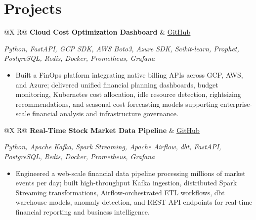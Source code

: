 \documentclass[a4paper,10pt]{article}
\newcommand{\ulink}[2]{\href{#1}{\uline{#2}}}
\newcommand{\subheading}[1]{{\color[HTML]{0A0A0A}\fontsize{12}{14}\selectfont\bfseries #1}}
\newcommand{\techstack}[1]{{\color[HTML]{5C5C5C}\fontsize{10.5}{12.5}\selectfont\itshape #1}}
\newcommand{\meta}[1]{{\color[HTML]{5C5C5C}\fontsize{10.5}{12.5}\selectfont #1}}
\begin{document}
\vspace{2pt}

\section{Projects}
\vspace{2pt}

\begin{tabularx}{\linewidth}{@{}X R@{}}
  \subheading{Cloud Cost Optimization Dashboard} &
  \meta{\ulink{https://github.com/su-jin1425/Cloud-Cost-Optimization-Dashboard}{GitHub}}
\end{tabularx}
\vspace{1pt}
\techstack{Python, FastAPI, GCP SDK, AWS Boto3, Azure SDK, Scikit-learn, Prophet, PostgreSQL, Redis, Docker, Prometheus, Grafana}
\begin{itemize}[nosep, leftmargin=1.5em, itemsep=1pt, topsep=2pt]
  \item {\color[HTML]{0A0A0A}\fontsize{11}{14}\selectfont Built a FinOps platform integrating native billing APIs across GCP, AWS, and Azure; delivered unified financial planning dashboards, budget monitoring, Kubernetes cost allocation, idle resource detection, rightsizing recommendations, and seasonal cost forecasting models supporting enterprise-scale financial analysis and infrastructure governance.}
\end{itemize}

\vspace{4pt}

\begin{tabularx}{\linewidth}{@{}X R@{}}
  \subheading{Real-Time Stock Market Data Pipeline} &
  \meta{\ulink{https://github.com/su-jin1425/Real-Time-Stock-Market-Data-Pipeline}{GitHub}}
\end{tabularx}
\vspace{1pt}
\techstack{Python, Apache Kafka, Spark Streaming, Apache Airflow, dbt, FastAPI, PostgreSQL, Redis, Docker, Prometheus, Grafana}
\begin{itemize}[nosep, leftmargin=1.5em, itemsep=1pt, topsep=2pt]
  \item {\color[HTML]{0A0A0A}\fontsize{11}{14}\selectfont Engineered a web-scale financial data pipeline processing millions of market events per day; built high-throughput Kafka ingestion, distributed Spark Streaming transformations, Airflow-orchestrated ETL workflows, dbt warehouse models, anomaly detection, and REST API endpoints for real-time financial reporting and business intelligence.}
\end{itemize}
\end{document}
